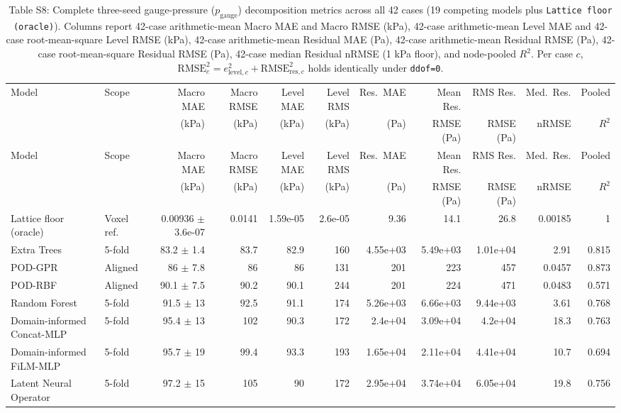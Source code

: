\begin{landscape}\scriptsize\setlength{\tabcolsep}{3.2pt}
\begin{longtable}{p{3.4cm}p{1.3cm}rrrrrrrrr}
\caption{Table S8: Complete three-seed gauge-pressure ($p_{\mathrm{gauge}}$) decomposition metrics across all 42 cases (19 competing models plus \texttt{Lattice floor (oracle)}). Columns report 42-case arithmetic-mean Macro MAE and Macro RMSE (kPa), 42-case arithmetic-mean Level MAE and 42-case root-mean-square Level RMSE (kPa), 42-case arithmetic-mean Residual MAE (Pa), 42-case arithmetic-mean Residual RMSE (Pa), 42-case root-mean-square Residual RMSE (Pa), 42-case median Residual nRMSE (1 kPa floor), and node-pooled $R^2$. Per case $c$, $\mathrm{RMSE}_c^2 = e_{\mathrm{level},c}^2 + \mathrm{RMSE}_{\mathrm{res},c}^2$ holds identically under \texttt{ddof=0}.}\\
\toprule Model & Scope & Macro MAE & Macro RMSE & Level MAE & Level RMS & Res.\ MAE & Mean Res. & RMS Res. & Med.\ Res. & Pooled\\
 & & (kPa) & (kPa) & (kPa) & (kPa) & (Pa) & RMSE (Pa) & RMSE (Pa) & nRMSE & $R^2$\\
\midrule\endfirsthead
\toprule Model & Scope & Macro MAE & Macro RMSE & Level MAE & Level RMS & Res.\ MAE & Mean Res. & RMS Res. & Med.\ Res. & Pooled\\
 & & (kPa) & (kPa) & (kPa) & (kPa) & (Pa) & RMSE (Pa) & RMSE (Pa) & nRMSE & $R^2$\\
\midrule\endhead
Lattice floor (oracle) & Voxel ref. & 0.00936 $\pm$ 3.6e-07 & 0.0141 & 1.59e-05 & 2.6e-05 & 9.36 & 14.1 & 26.8 & 0.00185 & 1 \\
Extra Trees & 5-fold & 83.2 $\pm$ 1.4 & 83.7 & 82.9 & 160 & 4.55e+03 & 5.49e+03 & 1.01e+04 & 2.91 & 0.815 \\
POD-GPR & Aligned & 86 $\pm$ 7.8 & 86 & 86 & 131 & 201 & 223 & 457 & 0.0457 & 0.873 \\
POD-RBF & Aligned & 90.1 $\pm$ 7.5 & 90.2 & 90.1 & 244 & 201 & 224 & 471 & 0.0483 & 0.571 \\
Random Forest & 5-fold & 91.5 $\pm$ 13 & 92.5 & 91.1 & 174 & 5.26e+03 & 6.66e+03 & 9.44e+03 & 3.61 & 0.768 \\
Domain-informed Concat-MLP & 5-fold & 95.4 $\pm$ 13 & 102 & 90.3 & 172 & 2.4e+04 & 3.09e+04 & 4.2e+04 & 18.3 & 0.763 \\
Domain-informed FiLM-MLP & 5-fold & 95.7 $\pm$ 19 & 99.4 & 93.3 & 193 & 1.65e+04 & 2.11e+04 & 4.41e+04 & 10.7 & 0.694 \\
Latent Neural Operator & 5-fold & 97.2 $\pm$ 15 & 105 & 90 & 172 & 2.95e+04 & 3.74e+04 & 6.05e+04 & 19.8 & 0.756 \\

\end{longtable}
\end{landscape}
